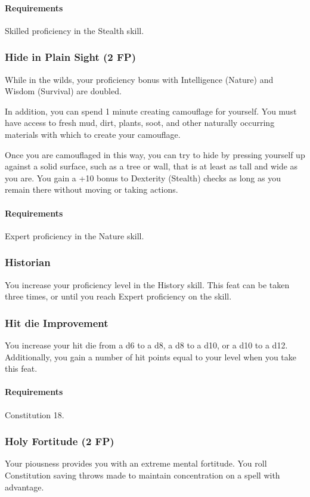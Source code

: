     \paragraph{Requirements} Skilled proficiency in the Stealth skill.
\subsubsection{Hide in Plain Sight (2 FP)} \label{feat::hideinplainsight}
    While in the wilds, your proficiency bonus with Intelligence (Nature) and Wisdom (Survival) are doubled.

    In addition, you can spend 1 minute creating camouflage for yourself.
    You must have access to fresh mud, dirt, plants, soot, and other naturally occurring materials with which to create your camouflage.

    Once you are camouflaged in this way, you can try to hide by pressing yourself up against a solid surface, such as a tree or wall, that is at least as tall and wide as you are.
    You gain a +10 bonus to Dexterity (Stealth) checks as long as you remain there without moving or taking actions.
    \paragraph{Requirements} Expert proficiency in the Nature skill.
\subsubsection{Historian} \label{feat::historian}
    You increase your proficiency level in the History skill.
    This feat can be taken three times, or until you reach Expert proficiency on the skill.
\subsubsection{Hit die Improvement} \label{feat::hitdieimprovement}
    You increase your hit die from a d6 to a d8, a d8 to a d10, or a d10 to a d12.
    Additionally, you gain a number of hit points equal to your level when you take this feat.
    \paragraph{Requirements} Constitution 18.
\subsubsection{Holy Fortitude (2 FP)} \label{feat::holyfortitude}
    Your piousness provides you with an extreme mental fortitude.
    You roll Constitution saving throws made to maintain concentration on a spell with advantage.

